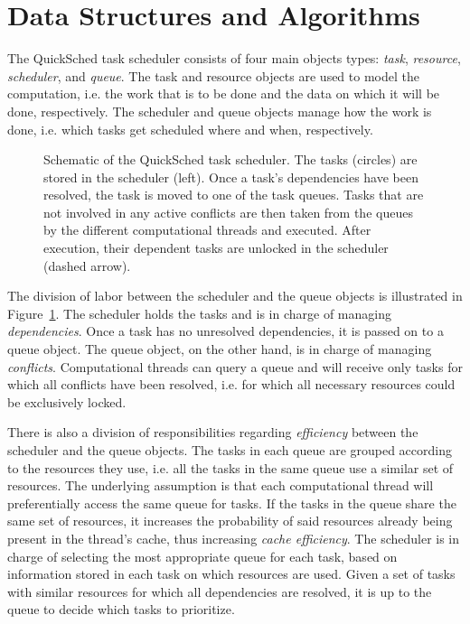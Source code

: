 \documentclass[fleqn,10pt]{wlpeerj}
\newcommand{\fig}[1]
    {Figure~\ref{fig:#1}}
\begin{document}
\section{Data Structures and Algorithms}

The QuickSched task scheduler consists of four main
objects types: {\em task}, {\em resource}, {\em scheduler},
and {\em queue}.
The task and resource objects are used
to model the computation, i.e. the work that is to be done
and the data on which it will be done, respectively.
The scheduler and queue objects manage
how the work is done, i.e. which tasks get scheduled
where and when, respectively.

\begin{figure}
    \centerline{}
    \caption{Schematic of the QuickSched task scheduler.
        The tasks (circles) are stored in the scheduler (left).
        Once a task's dependencies have been resolved, the task
        is moved to one of the task queues.
        Tasks that are not involved in any active conflicts
        are then taken from the queues by the different
        computational threads and executed.
        After execution, their dependent tasks are unlocked
        in the scheduler (dashed arrow).}
    \label{fig:QSched}
\end{figure}

The division of labor between the scheduler and
the queue objects is illustrated in \fig{QSched}.
The scheduler holds the tasks and is in charge
of managing {\em dependencies}.
Once a task has no unresolved dependencies, it is passed
on to a queue object.
The queue object, on the other hand, is in charge
of managing {\em conflicts}.
Computational threads can query a queue and will
receive only tasks for which all conflicts have been
resolved, i.e. for which all necessary resources could be 
exclusively locked.

There is also a division of responsibilities regarding
{\em efficiency} between the scheduler and the queue
objects.
The tasks in each queue are grouped according to the resources
they use, i.e. all the tasks in the same queue use a
similar set of resources.
The underlying assumption is that each computational
thread will preferentially access the same queue for tasks.
If the tasks in the queue share the same set of resources,
it increases the probability of said resources already
being present in the thread's cache, thus increasing
{\em cache efficiency}.
The scheduler is in charge of selecting the most appropriate
queue for each task, based on information stored in each task
on which resources are used.
Given a set of tasks with similar resources for which all
dependencies are resolved, it is up to the queue to decide which
tasks to prioritize.
\end{document}
